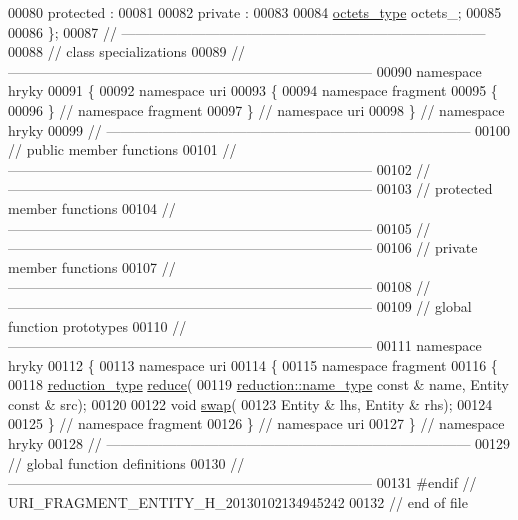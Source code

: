 \begin{DoxyCode}
00080 \textcolor{keyword}{protected} :
00081 
00082 \textcolor{keyword}{private} :
00083 
00084     \hyperlink{classhryky_1_1_vector}{octets_type} octets\_;
00085 
00086 \};
00087 \textcolor{comment}{//
      ------------------------------------------------------------------------------}
00088 \textcolor{comment}{// class specializations}
00089 \textcolor{comment}{//
      ------------------------------------------------------------------------------}
00090 \textcolor{keyword}{namespace }hryky
00091 \{
00092 \textcolor{keyword}{namespace }uri
00093 \{
00094 \textcolor{keyword}{namespace }fragment
00095 \{
00096 \} \textcolor{comment}{// namespace fragment}
00097 \} \textcolor{comment}{// namespace uri}
00098 \} \textcolor{comment}{// namespace hryky}
00099 \textcolor{comment}{//
      ------------------------------------------------------------------------------}
00100 \textcolor{comment}{// public member functions}
00101 \textcolor{comment}{//
      ------------------------------------------------------------------------------}
00102 \textcolor{comment}{//
      ------------------------------------------------------------------------------}
00103 \textcolor{comment}{// protected member functions}
00104 \textcolor{comment}{//
      ------------------------------------------------------------------------------}
00105 \textcolor{comment}{//
      ------------------------------------------------------------------------------}
00106 \textcolor{comment}{// private member functions}
00107 \textcolor{comment}{//
      ------------------------------------------------------------------------------}
00108 \textcolor{comment}{//
      ------------------------------------------------------------------------------}
00109 \textcolor{comment}{// global function prototypes}
00110 \textcolor{comment}{//
      ------------------------------------------------------------------------------}
00111 \textcolor{keyword}{namespace }hryky
00112 \{
00113 \textcolor{keyword}{namespace }uri
00114 \{
00115 \textcolor{keyword}{namespace }fragment
00116 \{
00118     \hyperlink{namespacehryky_a343a9a4c36a586be5c2693156200eadc}{reduction_type} \hyperlink{namespacehryky_1_1uri_ab4530b241565d82fb0768bb29031858f}{reduce}(
00119         \hyperlink{namespacehryky_1_1reduction_ac686c30a4c8d196bbd0f05629a6b921f}{reduction::name_type} \textcolor{keyword}{const} & name, Entity \textcolor{keyword}{const} & src);
00120 
00122     \textcolor{keywordtype}{void} \hyperlink{namespacehryky_1_1uri_a385681623309ce37d502b7efea1bf924}{swap}(
00123         Entity & lhs, Entity & rhs);
00124 
00125 \} \textcolor{comment}{// namespace fragment}
00126 \} \textcolor{comment}{// namespace uri}
00127 \} \textcolor{comment}{// namespace hryky}
00128 \textcolor{comment}{//
      ------------------------------------------------------------------------------}
00129 \textcolor{comment}{// global function definitions}
00130 \textcolor{comment}{//
      ------------------------------------------------------------------------------}
00131 \textcolor{preprocessor}{#endif // URI\_FRAGMENT\_ENTITY\_H\_20130102134945242}
00132 \textcolor{preprocessor}{}\textcolor{comment}{// end of file}
\end{DoxyCode}
